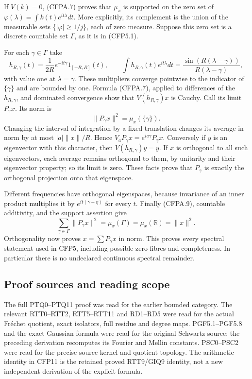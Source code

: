 If \(V(k)=0\), (CFPA.7) proves that \(\mu_x\) is supported on the zero
set of \(\varphi(\lambda)=\int k(t)e^{it\lambda}dt\). More explicitly,
its complement is the union of the measurable sets
\(\{|\varphi|\ge1/j\}\), each of zero measure. Suppose this zero set is
a discrete countable set \(\Gamma\), as it is in (CFP5.1).

For each \(\gamma\in\Gamma\) take \[
h_{R,\gamma}(t)=\frac1{2R}e^{-it\gamma}1_{[-R,R]}(t),
\qquad
\int h_{R,\gamma}(t)e^{it\lambda}dt
=\frac{\sin(R(\lambda-\gamma))}{R(\lambda-\gamma)},
\tag{CFPA.8}
\] with value one at \(\lambda=\gamma\). These multipliers converge
pointwise to the indicator of \(\{\gamma\}\) and are bounded by one.
Formula (CFPA.7), applied to differences of the \(h_{R,\gamma}\), and
dominated convergence show that \(V(h_{R,\gamma})x\) is Cauchy. Call its
limit \(P_\gamma x\). Its norm is \[
\|P_\gamma x\|^2=\mu_x(\{\gamma\}).
\tag{CFPA.9}
\] Changing the interval of integration by a fixed translation changes
its average in norm by at most \(|a|\|x\|/R\). Hence
\(V_aP_\gamma x=e^{ia\gamma}P_\gamma x\). Conversely if \(y\) is an
eigenvector with this character, then \(V(h_{R,\gamma})y=y\). If \(x\)
is orthogonal to all such eigenvectors, each average remains orthogonal
to them, by unitarity and their eigenvector property; so its limit is
zero. These facts prove that \(P_\gamma\) is exactly the orthogonal
projection onto that eigenspace.

Different frequencies have orthogonal eigenspaces, because invariance of
an inner product multiplies it by \(e^{it(\gamma-\eta)}\) for every
\(t\). Finally (CFPA.9), countable additivity, and the support assertion
give \[
\sum_{\gamma\in\Gamma}\|P_\gamma x\|^2
=\mu_x(\Gamma)=\mu_x(\mathbb R)=\|x\|^2.
\tag{CFPA.10}
\] Orthogonality now proves \(x=\sum P_\gamma x\) in norm. This proves
every spectral statement used in CFP5, including possible zero fibres
and completeness. In particular there is no undeclared continuous
spectral remainder.

\subsection{Proof sources and reading
scope}\label{proof-sources-and-reading-scope}

The full PTQ0--PTQ11 proof was read for the earlier bounded category.
The relevant RTT0--RTT2, RTT5--RTT11 and RD1--RD5 were read for the
actual Fréchet quotient, exact isolators, full residue and degree maps.
PGF5.1--PGF5.8 and the exact Gaussian formula were read for the original
Schwartz source; the preceding derivation recomputes its Fourier and
Mellin constants. PSC0--PSC2 were read for the precise source kernel and
quotient topology. The arithmetic identity in CFP11 is the retained
proved RTT9/GIQ9 identity, not a new independent derivation of the
explicit formula.

